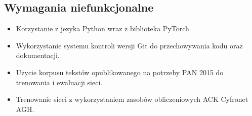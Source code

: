 \newpage
\subsection{Wymagania niefunkcjonalne}
\begin{itemize}
 	\item Korzystanie z jezyka Python wraz z biblioteka PyTorch.
 	\item Wykorzystanie systemu kontroli wersji Git do przechowywania kodu oraz dokumentacji.
 	\item Użycie korpusu tekstów opublikowanego na potrzeby PAN 2015 do trenowania i ewaluacji sieci.
 	\item Trenowanie sieci z wykorzystaniem zasobów obliczeniowych ACK Cyfronet AGH.
\end{itemize}
